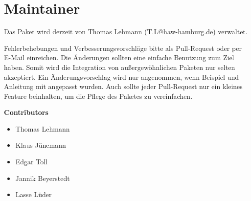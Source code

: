 %
\section{Maintainer}\label{sec:maintainer}
Das Paket wird derzeit von Thomas Lehmann (T.L@haw-hamburg.de) verwaltet.

Fehlerbehebungen und Verbesserungsvorschläge bitte als Pull-Request oder per E-Mail einreichen. Die Änderungen sollten eine einfache Benutzung zum Ziel haben. Somit wird die Integration von außergewöhnlichen Paketen nur selten akzeptiert. Ein Änderungsvorschlag wird nur angenommen, wenn Beispiel und Anleitung mit angepasst wurden. Auch sollte jeder Pull-Request nur ein kleines Feature beinhalten, um die Pflege des Paketes zu vereinfachen.

\textbf{Contributors}
\begin{itemize}
\item Thomas Lehmann
\item Klaus Jünemann
\item Edgar Toll
\item Jannik Beyerstedt
\item Lasse Lüder
\end{itemize}
